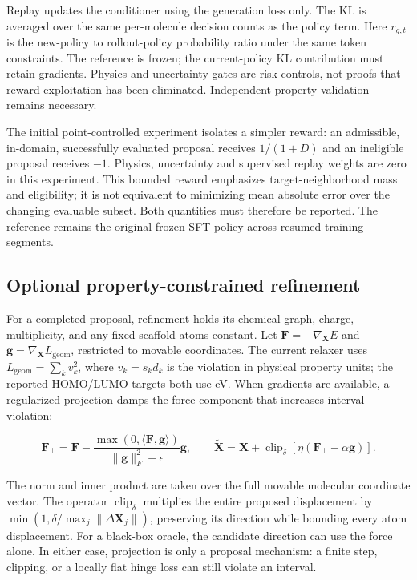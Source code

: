 \documentclass[11pt,a4paper]{article}
\begin{document}
Replay updates the conditioner using the generation loss only. The KL is
averaged over the same per-molecule decision counts as the policy term.
Here \(r_{g,t}\) is the new-policy to rollout-policy probability ratio
under the same token constraints. The reference is frozen; the
current-policy KL contribution must retain gradients. Physics and
uncertainty gates are risk controls, not proofs that reward exploitation
has been eliminated. Independent property validation remains necessary.

The initial point-controlled experiment isolates a simpler reward: an
admissible, in-domain, successfully evaluated proposal receives
\(1/(1+D)\) and an ineligible proposal receives \(-1\). Physics,
uncertainty and supervised replay weights are zero in this experiment.
This bounded reward emphasizes target-neighborhood mass and eligibility;
it is not equivalent to minimizing mean absolute error over the changing
evaluable subset. Both quantities must therefore be reported. The
reference remains the original frozen SFT policy across resumed training
segments.

\FloatBarrier
\subsection{Optional property-constrained
refinement}\label{optional-property-constrained-refinement}

For a completed proposal, refinement holds its chemical graph, charge,
multiplicity, and any fixed scaffold atoms constant. Let
\(\mathbf F=-\nabla_{\mathbf X}E\) and
\(\mathbf g=\nabla_{\mathbf X}L_{\mathrm{geom}}\), restricted to movable
coordinates. The current relaxer uses
\(L_{\mathrm{geom}}=\sum_k v_k^2\), where \(v_k=s_kd_k\) is the
violation in physical property units; the reported HOMO/LUMO targets
both use eV. When gradients are available, a regularized projection
damps the force component that increases interval violation:

\[
\mathbf F_{\perp}=\mathbf F-\frac{\max(0,\langle\mathbf F,\mathbf g\rangle)}{\|\mathbf g\|_F^2+\epsilon}\mathbf g,
\qquad \widetilde{\mathbf X}=\mathbf X+\operatorname{clip}_{\delta}\!\left[\eta(\mathbf F_{\perp}-\alpha\mathbf g)\right].
\]

The norm and inner product are taken over the full movable molecular
coordinate vector. The operator \(\operatorname{clip}_{\delta}\)
multiplies the entire proposed displacement by
\(\min(1,\delta/\max_j\|\Delta\mathbf X_j\|)\), preserving its direction
while bounding every atom displacement. For a black-box oracle, the
candidate direction can use the force alone. In either case, projection
is only a proposal mechanism: a finite step, clipping, or a locally flat
hinge loss can still violate an interval.
\end{document}
